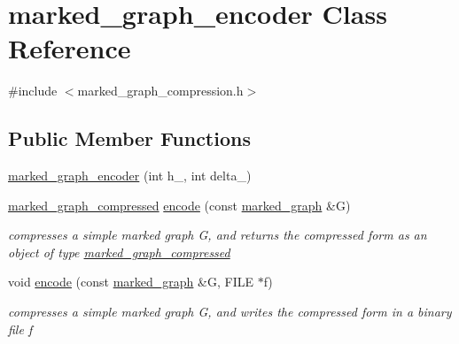 \hypertarget{classmarked__graph__encoder}{}\section{marked\+\_\+graph\+\_\+encoder Class Reference}
\label{classmarked__graph__encoder}


{\ttfamily \#include $<$marked\+\_\+graph\+\_\+compression.\+h$>$}

\subsection*{Public Member Functions}
\begin{DoxyCompactItemize}
\item 
\hyperlink{classmarked__graph__encoder_a128d2a38b23ce620c77d00a5eff487ea}{marked\+\_\+graph\+\_\+encoder} (int h\+\_\+, int delta\+\_\+)
\item 
\hyperlink{classmarked__graph__compressed}{marked\+\_\+graph\+\_\+compressed} \hyperlink{classmarked__graph__encoder_aa7fa19a225dd9b31d6fef9583fab8cf1}{encode} (const \hyperlink{classmarked__graph}{marked\+\_\+graph} \&G)
\begin{DoxyCompactList}\small\item\em compresses a simple marked graph G, and returns the compressed form as an object of type {\ttfamily \hyperlink{classmarked__graph__compressed}{marked\+\_\+graph\+\_\+compressed}} \end{DoxyCompactList}\item 
void \hyperlink{classmarked__graph__encoder_a75b32c3c4557bec3322df60ac476fdc9}{encode} (const \hyperlink{classmarked__graph}{marked\+\_\+graph} \&G, F\+I\+LE $\ast$f)
\begin{DoxyCompactList}\small\item\em compresses a simple marked graph G, and writes the compressed form in a binary file f \end{DoxyCompactList}\end{DoxyCompactItemize}
